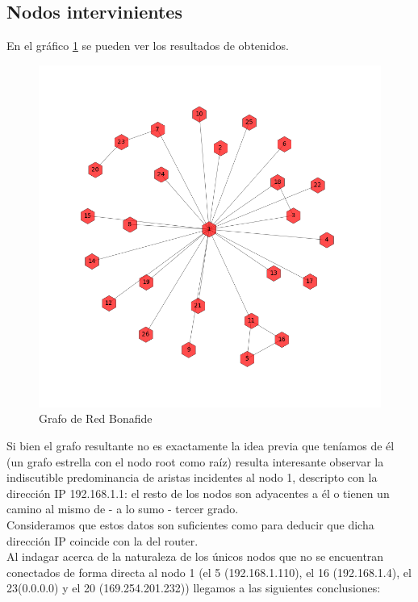 \subsection{Nodos intervinientes}

En el gr\'afico \ref{bonafideGraph} se pueden ver los resultados de obtenidos.

\begin{figure}[h!]
    \centering                                                       
    \includegraphics[width=400pt]{img/bonafideGraph.png}
    \caption{Grafo de Red Bonafide}
    \label{bonafideGraph}
\end{figure}
Si bien el grafo resultante no es exactamente la idea previa que ten\'iamos de \'el (un grafo estrella con el nodo root como ra\'iz) resulta interesante observar la indiscutible predominancia de aristas incidentes al nodo 1, descripto con la direcci\'on IP 192.168.1.1: el resto de los nodos son adyacentes a \'el o tienen un camino al mismo de - a lo sumo - tercer grado.\\
Consideramos que estos datos son suficientes como para deducir que dicha direcci\'on IP coincide con la del router.\\
Al indagar acerca de la naturaleza de los \'unicos nodos que no se encuentran conectados de forma directa al nodo 1 (el 5 (192.168.1.110), el 16 (192.168.1.4), el 23(0.0.0.0) y el 20 (169.254.201.232)) llegamos a las siguientes conclusiones: \\
